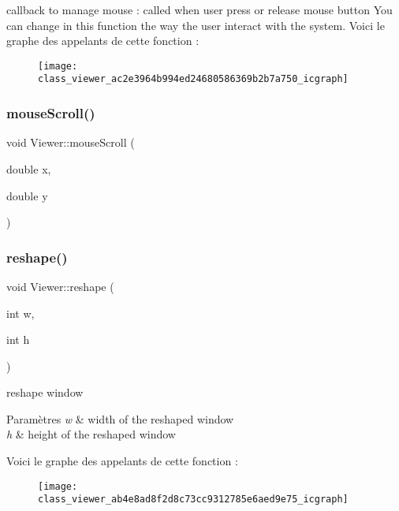 callback to manage mouse \+: called when user press or release mouse button You can change in this function the way the user interact with the system. Voici le graphe des appelants de cette fonction \+:
\nopagebreak
\begin{figure}[H]
\begin{center}
\leavevmode
\texttt{[image: class\_viewer\_ac2e3964b994ed24680586369b2b7a750\_icgraph]}
\end{center}
\end{figure}
\mbox{\label{class_viewer_abd042d0aa5ae88ef0261d83c15ce8d4b}} 
\subsubsection{\texorpdfstring{mouse\+Scroll()}{mouseScroll()}}
{\footnotesize\ttfamily void Viewer\+::mouse\+Scroll (\begin{DoxyParamCaption}\item[{double}]{x,  }\item[{double}]{y }\end{DoxyParamCaption})}

\mbox{\label{class_viewer_ab4e8ad8f2d8c73cc9312785e6aed9e75}} 
\subsubsection{\texorpdfstring{reshape()}{reshape()}}
{\footnotesize\ttfamily void Viewer\+::reshape (\begin{DoxyParamCaption}\item[{int}]{w,  }\item[{int}]{h }\end{DoxyParamCaption})}



reshape window 


\begin{DoxyParams}{Paramètres}
{\em w} & width of the reshaped window \\
\hline
{\em h} & height of the reshaped window \\
\hline
\end{DoxyParams}
Voici le graphe des appelants de cette fonction \+:
\nopagebreak
\begin{figure}[H]
\begin{center}
\leavevmode
\texttt{[image: class\_viewer\_ab4e8ad8f2d8c73cc9312785e6aed9e75\_icgraph]}
\end{center}
\end{figure}
\mbox{\label{class_viewer_a7deac2bd87e6c5a76c6eb600306d6096}} 
